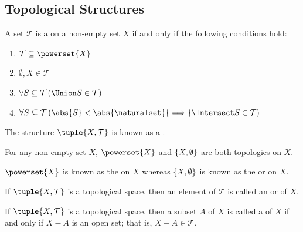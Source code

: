\subsection{Topological Structures}

\begin{dfn}[Topology]
     \label{dfn:topology}
    A set \( \mathcal{T} \) is a  on a non-empty set \( X \) if and only if the following conditions hold:
    \begin{enumerate}[topsep=2pt,noitemsep,label=\textup{\texttt{(\alph*)}}]
        \item \( \mathcal{T} \subseteq \powerset{X} \)
        \item \( \emptyset, X \in \mathcal{T} \)
        \item \( \forall S \subseteq \mathcal{T} \, \mleft( \Union S \in \mathcal{T} \mright) \)
        \item \( \forall S \subseteq \mathcal{T} \, \mleft( \abs{S} < \abs{\naturalset} {\implies} \Intersect S \in \mathcal{T} \mright) \)
    \end{enumerate}
    \vspace{0.1cm}
    \noindent
    The structure \( \tuple{X, \mathcal{T}} \) is known as a .
\end{dfn}

\begin{cor}
    For any non-empty set \( X \), \( \powerset{X} \) and \( \mleft\{ X, \emptyset \mright\} \) are both
    topologies on \( X \).
\end{cor}

\begin{rem}
    \( \powerset{X} \) is known as the  on \( X \) whereas \( \mleft\{ X, \emptyset \mright\} \) is known as the  or
     on \( X \).
\end{rem}

\begin{dfn}
     \label{dfn:topological-space-open-set}
    If \( \tuple{X, \mathcal{T}} \) is a topological space, then an element of \( \mathcal{T} \) is called an  or  of \( X \).
\end{dfn}

\begin{dfn}
     \label{dfn:topological-space-closed-set}
    If \( \tuple{X, \mathcal{T}} \) is a topological space, then a subset \( A \) of \( X \) is called a  of \( X \) if and only if
    \( X - A \) is an open set; that is, \( X - A \in \mathcal{T} \).
\end{dfn}


